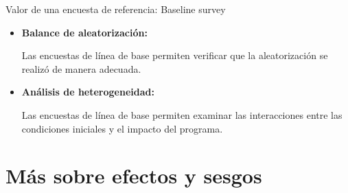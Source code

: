 \documentclass[11pt, aspectratio=169, compress]{beamer}
\begin{document}
\begin{frame}{Valor de una encuesta de referencia: Baseline survey}
	\begin{itemize}
		\item \textbf{Balance de aleatorización:} 
					
		Las encuestas de línea de base permiten verificar que la aleatorización se realizó de manera adecuada.
		
		\item \textbf{Análisis de heterogeneidad:} 
				
		Las encuestas de línea de base permiten examinar las interacciones entre las condiciones iniciales y el impacto del programa.
	\end{itemize}
\end{frame}
\section{Más sobre efectos y sesgos}
\end{document}
